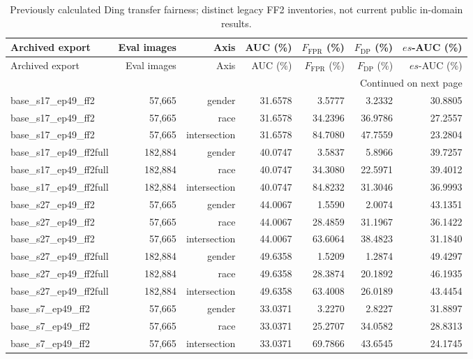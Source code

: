 \documentclass[10pt]{article}
\begin{document}
\begin{longtable}{@{}lrrrrrr@{}}
\caption{Previously calculated Ding transfer fairness; distinct legacy FF2 inventories, not current public in-domain results.}\\
\toprule
Archived export & Eval images & Axis & AUC (\%) & $F_{\mathrm{FPR}}$ (\%) & $F_{\mathrm{DP}}$ (\%) & $es$-AUC (\%) \\
\midrule
\endfirsthead
\toprule
Archived export & Eval images & Axis & AUC (\%) & $F_{\mathrm{FPR}}$ (\%) & $F_{\mathrm{DP}}$ (\%) & $es$-AUC (\%) \\
\midrule
\endhead
\midrule
\multicolumn{7}{r}{Continued on next page}\\
\endfoot
\bottomrule
\endlastfoot
base\_s17\_ep49\_ff2 & 57,665 & gender & 31.6578 & 3.5777 & 3.2332 & 30.8805 \\
base\_s17\_ep49\_ff2 & 57,665 & race & 31.6578 & 34.2396 & 36.9786 & 27.2557 \\
base\_s17\_ep49\_ff2 & 57,665 & intersection & 31.6578 & 84.7080 & 47.7559 & 23.2804 \\
base\_s17\_ep49\_ff2full & 182,884 & gender & 40.0747 & 3.5837 & 5.8966 & 39.7257 \\
base\_s17\_ep49\_ff2full & 182,884 & race & 40.0747 & 34.3080 & 22.5971 & 39.4012 \\
base\_s17\_ep49\_ff2full & 182,884 & intersection & 40.0747 & 84.8232 & 31.3046 & 36.9993 \\
base\_s27\_ep49\_ff2 & 57,665 & gender & 44.0067 & 1.5590 & 2.0074 & 43.1351 \\
base\_s27\_ep49\_ff2 & 57,665 & race & 44.0067 & 28.4859 & 31.1967 & 36.1422 \\
base\_s27\_ep49\_ff2 & 57,665 & intersection & 44.0067 & 63.6064 & 38.4823 & 31.1840 \\
base\_s27\_ep49\_ff2full & 182,884 & gender & 49.6358 & 1.5209 & 1.2874 & 49.4297 \\
base\_s27\_ep49\_ff2full & 182,884 & race & 49.6358 & 28.3874 & 20.1892 & 46.1935 \\
base\_s27\_ep49\_ff2full & 182,884 & intersection & 49.6358 & 63.4008 & 26.0189 & 43.4454 \\
base\_s7\_ep49\_ff2 & 57,665 & gender & 33.0371 & 3.2270 & 2.8227 & 31.8897 \\
base\_s7\_ep49\_ff2 & 57,665 & race & 33.0371 & 25.2707 & 34.0582 & 28.8313 \\
base\_s7\_ep49\_ff2 & 57,665 & intersection & 33.0371 & 69.7866 & 43.6545 & 24.1745 \\

\end{longtable}
\end{document}
